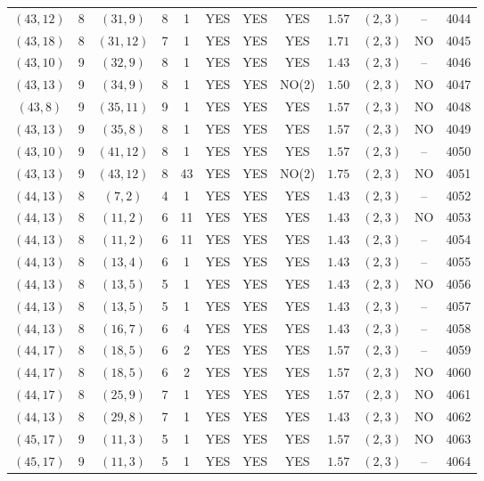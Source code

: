 \begin{longtable}{|c|c|c|c|c|c|c|c|c|c|c|c|}
$(43,12)$ & 8 & $(31,9)$ & 8 & 1 & YES & YES & YES & $1.57$ & $(2,3)$ & -- & 4044\\
$(43,18)$ & 8 & $(31,12)$ & 7 & 1 & YES & YES & YES & $1.71$ & $(2,3)$ & NO & 4045\\
$(43,10)$ & 9 & $(32,9)$ & 8 & 1 & YES & YES & YES & $1.43$ & $(2,3)$ & -- & 4046\\
$(43,13)$ & 9 & $(34,9)$ & 8 & 1 & YES & YES & NO(2) & $1.50$ & $(2,3)$ & NO & 4047\\
$(43,8)$ & 9 & $(35,11)$ & 9 & 1 & YES & YES & YES & $1.57$ & $(2,3)$ & NO & 4048\\
$(43,13)$ & 9 & $(35,8)$ & 8 & 1 & YES & YES & YES & $1.57$ & $(2,3)$ & NO & 4049\\
$(43,10)$ & 9 & $(41,12)$ & 8 & 1 & YES & YES & YES & $1.57$ & $(2,3)$ & -- & 4050\\
$(43,13)$ & 9 & $(43,12)$ & 8 & 43 & YES & YES & NO(2) & $1.75$ & $(2,3)$ & NO & 4051\\
$(44,13)$ & 8 & $(7,2)$ & 4 & 1 & YES & YES & YES & $1.43$ & $(2,3)$ & -- & 4052\\
$(44,13)$ & 8 & $(11,2)$ & 6 & 11 & YES & YES & YES & $1.43$ & $(2,3)$ & NO & 4053\\
$(44,13)$ & 8 & $(11,2)$ & 6 & 11 & YES & YES & YES & $1.43$ & $(2,3)$ & -- & 4054\\
$(44,13)$ & 8 & $(13,4)$ & 6 & 1 & YES & YES & YES & $1.43$ & $(2,3)$ & -- & 4055\\
$(44,13)$ & 8 & $(13,5)$ & 5 & 1 & YES & YES & YES & $1.43$ & $(2,3)$ & NO & 4056\\
$(44,13)$ & 8 & $(13,5)$ & 5 & 1 & YES & YES & YES & $1.43$ & $(2,3)$ & -- & 4057\\
$(44,13)$ & 8 & $(16,7)$ & 6 & 4 & YES & YES & YES & $1.43$ & $(2,3)$ & -- & 4058\\
$(44,17)$ & 8 & $(18,5)$ & 6 & 2 & YES & YES & YES & $1.57$ & $(2,3)$ & -- & 4059\\
$(44,17)$ & 8 & $(18,5)$ & 6 & 2 & YES & YES & YES & $1.57$ & $(2,3)$ & NO & 4060\\
$(44,17)$ & 8 & $(25,9)$ & 7 & 1 & YES & YES & YES & $1.57$ & $(2,3)$ & NO & 4061\\
$(44,13)$ & 8 & $(29,8)$ & 7 & 1 & YES & YES & YES & $1.43$ & $(2,3)$ & NO & 4062\\
$(45,17)$ & 9 & $(11,3)$ & 5 & 1 & YES & YES & YES & $1.57$ & $(2,3)$ & NO & 4063\\
$(45,17)$ & 9 & $(11,3)$ & 5 & 1 & YES & YES & YES & $1.57$ & $(2,3)$ & -- & 4064\\

\end{longtable}
